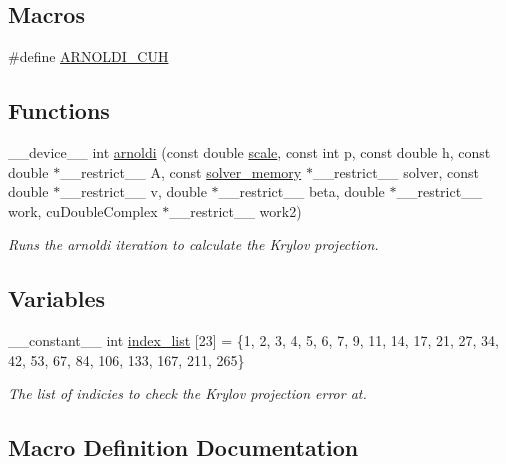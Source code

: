 \subsection*{Macros}
\begin{DoxyCompactItemize}
\item 
\#define \hyperlink{arnoldi_8cuh_abeda2f8ea38aa8f4d7bd240e22181d1c}{A\+R\+N\+O\+L\+D\+I\+\_\+\+C\+UH}
\end{DoxyCompactItemize}
\subsection*{Functions}
\begin{DoxyCompactItemize}
\item 
\+\_\+\+\_\+device\+\_\+\+\_\+ int \hyperlink{arnoldi_8cuh_ab3811b1c15ea17c96f86d55e137e4374}{arnoldi} (const double \hyperlink{inverse_8cu_adbb4f3f3af5f968a94f717729803c88d}{scale}, const int p, const double h, const double $\ast$\+\_\+\+\_\+restrict\+\_\+\+\_\+ A, const \hyperlink{structsolver__memory}{solver\+\_\+memory} $\ast$\+\_\+\+\_\+restrict\+\_\+\+\_\+ solver, const double $\ast$\+\_\+\+\_\+restrict\+\_\+\+\_\+ v, double $\ast$\+\_\+\+\_\+restrict\+\_\+\+\_\+ beta, double $\ast$\+\_\+\+\_\+restrict\+\_\+\+\_\+ work, cu\+Double\+Complex $\ast$\+\_\+\+\_\+restrict\+\_\+\+\_\+ work2)
\begin{DoxyCompactList}\small\item\em Runs the arnoldi iteration to calculate the Krylov projection. \end{DoxyCompactList}\end{DoxyCompactItemize}
\subsection*{Variables}
\begin{DoxyCompactItemize}
\item 
\+\_\+\+\_\+constant\+\_\+\+\_\+ int \hyperlink{arnoldi_8cuh_a3e638b2302ac9e7f341e07f7eb51ec5d}{index\+\_\+list} \mbox{[}23\mbox{]} = \{1, 2, 3, 4, 5, 6, 7, 9, 11, 14, 17, 21, 27, 34, 42, 53, 67, 84, 106, 133, 167, 211, 265\}
\begin{DoxyCompactList}\small\item\em The list of indicies to check the Krylov projection error at. \end{DoxyCompactList}\end{DoxyCompactItemize}


\subsection{Macro Definition Documentation}

